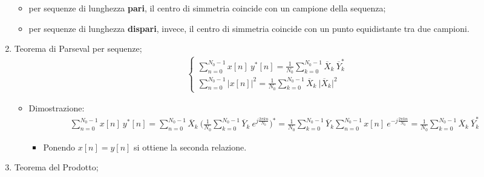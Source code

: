 \documentclass[
]{article}
\providecommand{\tightlist}{%
  \setlength{\itemsep}{0pt}\setlength{\parskip}{0pt}}
\begin{document}
\begin{enumerate}
  \begin{itemize}
  \tightlist
  \item
    per sequenze di lunghezza \textbf{pari}, il centro di simmetria
    coincide con un campione della sequenza;
  \item
    per sequenze di lunghezza \textbf{dispari}, invece, il centro di
    simmetria coincide con un punto equidistante tra due campioni.
  \end{itemize}
\item
  Teorema di Parseval per sequenze; \begin{gather*}
  \left\{ \begin{array}{cl} \displaystyle
  \sum_{n=0}^{N_0 -1} x[n] \ y^{*}[n] = \frac{1}{N_0} \sum_{k=0}^{N_0 -1}\overline{X}_k \ \overline{Y}^{*}_{k} \\
  \displaystyle\sum_{n=0}^{N_0 -1} \Big|x[n]\Big|^{2} = \frac{1}{N_0} \sum_{k=0}^{N_0 -1}\overline{X}_k \ \Big|\overline{X}_{k}\Big|^{2}
  \end{array} \right.
  \end{gather*}

  \begin{itemize}
  \tightlist
  \item
    Dimostrazione: \begin{gather*}
    \sum_{n=0}^{N_0 -1} x[n] \ y^{*}[n] =\sum_{n=0}^{N_0 -1}\overline{X}_k \ \Big(\frac{1}{N_0}\sum_{k=0}^{N_0 - 1}\overline{Y}_k \ e^{j\frac{2\pi kn}{N_0}}\Big)^{*} 
    = \frac{1}{N_0} \sum_{k=0}^{N_0 -1} \overline{Y}_k \sum_{n=0}^{N_0 -1 }x[n] \ e^{-j\frac{2\pi kn}{N_0}} = \frac{1}{N_0} \sum_{k=0}^{N_0 -1} \overline{X}_k \ \overline{Y}^{*}_k
    \end{gather*}

    \begin{itemize}
    \tightlist
    \item
      Ponendo \(x[n]=y[n]\) si ottiene la seconda relazione.
    \end{itemize}
  \end{itemize}
\item
  Teorema del Prodotto;


\end{enumerate}
\end{document}
